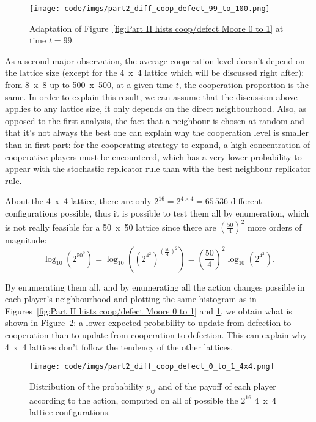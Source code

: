 \documentclass{article}
\begin{document}
\begin{figure}[!h]
\hspace{-1.8cm}
\texttt{[image: code/imgs/part2\_diff\_coop\_defect\_99\_to\_100.png]}
\vspace{-1cm}
\caption{Adaptation of Figure~\ref{fig:Part II hists coop/defect Moore 0 to 1} at time $t=99$.
\label{fig:Part II hists coop/defect Moore 99 to 100}}
\end{figure}

As a second major observation, the average cooperation level doesn't depend on the lattice size (except
for the 4~x~4 lattice which will be discussed right after): from 8~x~8 up to 500~x~500, at a given time $t$,
the cooperation proportion is the same. In order to explain this result, we can assume that the discussion
above applies to any lattice size, it only depends on the direct neighbourhood. Also, as opposed to the
first analysis, the fact that a neighbour is chosen at random and that it's not always the best one can
explain why the cooperation level is smaller than in first part: for the cooperating strategy to expand,
a high concentration of cooperative players must be encountered, which has a very lower probability to
appear with the stochastic replicator rule than with the best neighbour replicator rule.

About the 4~x~4 lattice, there are only $2^{16} = 2^{4 \times 4} = 65\,536$ different configurations possible,
thus it is possible to test them all by enumeration, which is not really feasible for a 50~x~50 lattice
since there are $\left(\frac {50}4\right)^2$ more orders of magnitude:
\[\log_{10}\left(2^{50^2}\right) = \log_{10}\left(\left(2^{4^2}\right)^{\left(\frac {50}4\right)^2}\right)
= \left(\frac {50}4\right)^2\log_{10}\left(2^{4^2}\right).\]

By enumerating them all, and by enumerating all the action changes possible in each player's neighbourhood
and plotting the same histogram as in Figures~\ref{fig:Part II hists coop/defect Moore 0 to 1} and
\ref{fig:Part II hists coop/defect Moore 99 to 100}, we obtain what is shown in
Figure~\ref{fig:Part II hists coop/defect Moore all 4x4}: a lower expected probability to update from
defection to cooperation than to update from cooperation to defection. This can explain why 4~x~4 lattices
don't follow the tendency of the other lattices.

\begin{figure}[!t]
\hspace{-1.8cm}
\texttt{[image: code/imgs/part2\_diff\_coop\_defect\_0\_to\_1\_4x4.png]}
\vspace{-1cm}
\caption{Distribution of the probability $p_{ij}$ and of the payoff of each player according to the action,
computed on all of possible the $2^{16}$ 4~x~4 lattice configurations.
\label{fig:Part II hists coop/defect Moore all 4x4}}
\end{figure}
\end{document}
